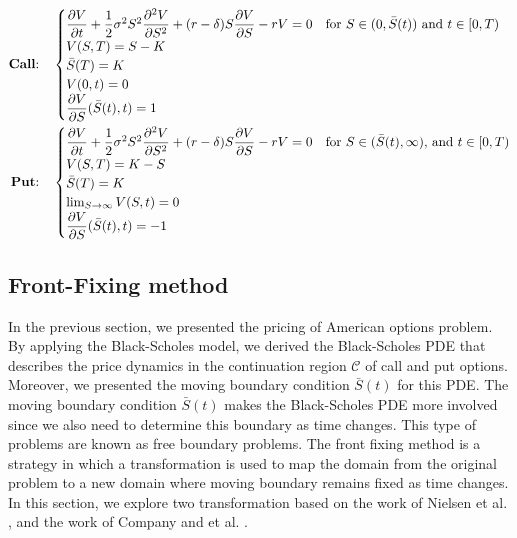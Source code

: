 \begin{subequations} \label{eq:blackscholes:preliminaries:american_options_pde_free_boundary_problem_full}
  \begin{align}
    \label{eq:blackscholes:preliminaries:call_american_options_pde_free_boundary_problem_full}
    \text{\textbf{Call}:} \quad &
    \begin{cases}
      \dfrac{\partial{V}}{\partial{t}} + \dfrac{1}{2}\sigma^{2} S^2 \dfrac{\partial^2{V}}{\partial{S}^2} + (r - \delta)S\dfrac{\partial{V}}{\partial{S}} - rV = 0 & \text{for $S \in (0,\bar{S}(t))$ and $t \in [0, T)$} \\ 
      V(S, T) = S - K \\
      \bar{S}(T) = K \\ 
      V(0, t) = 0 \\
      \dfrac{\partial{V}}{\partial{S}}(\bar{S}(t), t) = 1
    \end{cases} \\
    \text{\textbf{Put}:} \quad &
    \begin{cases}
      \dfrac{\partial{V}}{\partial{t}} + \dfrac{1}{2}\sigma^{2} S^2 \dfrac{\partial^2{V}}{\partial{S}^2} + (r - \delta)S\dfrac{\partial{V}}{\partial{S}} - rV = 0 & \text{for $S \in (\bar{S}(t), \infty)$, and $t \in [0, T)$} \\
      V(S, T) = K - S \\
      \bar{S}(T) = K \\ 
      \lim_{S\rightarrow\infty}V(S, t) = 0 \\ 
      \dfrac{\partial{V}}{\partial{S}}(\bar{S}(t), t) = -1
    \end{cases}
  \end{align}
\end{subequations}
\subsection{Front-Fixing method}
In the previous section, we presented the pricing of American options problem.
By applying the Black-Scholes model, we derived the Black-Scholes PDE that
describes the price dynamics in the continuation region $\mathcal{C}$ of call
and put options. Moreover, we presented the moving boundary condition
$\bar{S}(t)$ for this PDE. The moving boundary condition $\bar{S}(t)$ makes the
Black-Scholes PDE more involved since we also need to determine this boundary
as time changes. This type of problems are known as free boundary problems. The
front fixing method is a strategy in which a transformation is used to map the  domain from the original problem to a new domain where moving boundary remains fixed as time changes. In this section, we explore two transformation based on the work of Nielsen et al. \cite{nielsen_2001}, and the work of Company and et al. \cite{company_egorova_jodar_2014}.
